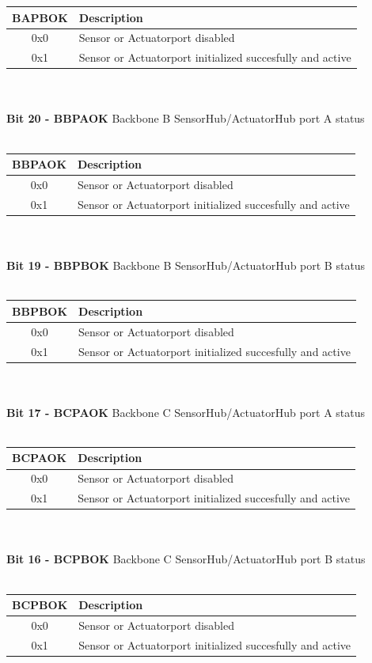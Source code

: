 \begin{tabular}{|c|l|}
    \hline
   BAPBOK & Description\\ \hline
   0x0 & Sensor or Actuatorport disabled\\ \hline
   0x1 & Sensor or Actuatorport initialized succesfully and active\\ \hline
\end{tabular}\\\\
\textbf{Bit 20 - BBPAOK} Backbone B SensorHub/ActuatorHub port A status\\\\
\begin{tabular}{|c|l|}
    \hline
   BBPAOK & Description\\ \hline
   0x0 & Sensor or Actuatorport disabled\\ \hline
   0x1 & Sensor or Actuatorport initialized succesfully and active\\ \hline
\end{tabular}\\\\
\textbf{Bit 19 - BBPBOK} Backbone B SensorHub/ActuatorHub port B status\\\\
\begin{tabular}{|c|l|}
    \hline
   BBPBOK & Description\\ \hline
   0x0 & Sensor or Actuatorport disabled\\ \hline
   0x1 & Sensor or Actuatorport initialized succesfully and active\\ \hline
\end{tabular}\\\\
\textbf{Bit 17 - BCPAOK} Backbone C SensorHub/ActuatorHub port A status\\\\
\begin{tabular}{|c|l|}
    \hline
   BCPAOK & Description\\ \hline
   0x0 & Sensor or Actuatorport disabled\\ \hline
   0x1 & Sensor or Actuatorport initialized succesfully and active\\ \hline
\end{tabular}\\\\
\textbf{Bit 16 - BCPBOK} Backbone C SensorHub/ActuatorHub port B status\\\\
\begin{tabular}{|c|l|}
    \hline
   BCPBOK & Description\\ \hline
   0x0 & Sensor or Actuatorport disabled\\ \hline
   0x1 & Sensor or Actuatorport initialized succesfully and active\\ \hline
\end{tabular}\\\\
